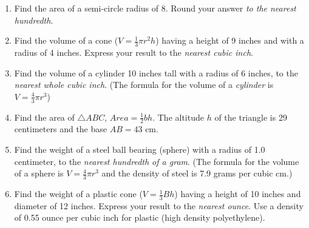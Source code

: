 \documentclass[12pt, twoside]{article}
\begin{document}
  \begin{enumerate}

    \item Find the area of a semi-circle radius of 8. Round your answer \emph{to the nearest hundredth}.\vspace{3cm}

    \item Find the volume of a cone ($V=\frac{1}{3}\pi r^2 h$) having a height of 9 inches and with a radius of 4 inches. Express your result to the \emph{nearest cubic inch}. \vspace{7cm}

    \item Find the volume of a cylinder 10 inches tall with a radius of 6 inches, to the \emph{nearest whole cubic inch}. (The formula for the volume of a \emph{cylinder} is $V=\frac{4}{3}\pi r^3$)  \vspace{5cm}

\newpage

    \item Find the area of $\triangle ABC$,  $Area= \frac{1}{2}bh$. The altitude $h$ of the triangle is 29 centimeters and the base $AB=43$ cm.\\[0.5cm]
     \vspace{1.0cm}


   \item Find the weight of a steel ball bearing (sphere) with a radius of 1.0 centimeter, to the \emph{nearest hundredth of a gram}. (The formula for the volume of a sphere is $V=\frac{4}{3}\pi r^3$ and the density of steel is 7.9 grams per cubic cm.)  \vspace{6cm}


   \item Find the weight of a plastic cone ($V=\frac{1}{3}Bh$) having a height of 10 inches and diameter of 12 inches. Express your result to the \emph{nearest ounce}. Use a density of 0.55 ounce per cubic inch for plastic (high density polyethylene).


   \newpage


\end{enumerate}
\end{document}
